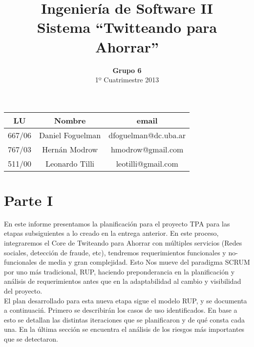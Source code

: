 \documentclass[a4paper,spanish]{article}
\title{Ingeniería de Software II\\ \textbf{Sistema ``Twitteando para Ahorrar''}}
\author{\textbf{Grupo 6}\\ 1º Cuatrimestre 2013}
\date{}
\begin{document}
\maketitle
\vspace{10cm}
\begin{center}

\begin{tabular}{|c|c|c|}
\hline
\hline
\textbf{LU}&\textbf{Nombre}&\textbf{email}\\
\hline
667/06&Daniel Foguelman &dfoguelman@dc.uba.ar\\
\hline
767/03&Hernán Modrow&hmodrow@gmail.com\\
\hline
511/00&Leonardo Tilli&leotilli@gmail.com\\
\hline
\hline
\end{tabular}
\end{center}
\newpage

\section{Parte I}

 En este informe presentamos la planificación para el proyecto TPA para las etapas subsiguientes a lo creado en la entrega anterior. En este proceso, integraremos el Core de Twiteando para Ahorrar con múltiples servicios (Redes sociales, detección de fraude, etc), tendremos requerimientos funcionales y no-funcionales de media y gran complejidad. Esto Nos mueve del paradigma SCRUM por uno más tradicional, RUP, haciendo preponderancia en la planificación y análisis de requerimientos antes que en la adaptabilidad al cambio y visibilidad del proyecto. \\

 El plan desarrollado para esta nueva etapa sigue el modelo RUP, y se documenta a continuaci\'n. Primero se describir\'an los casos de uso identificados. En base a esto se detallan las distintas iteraciones que se planificaron y de qu\'e consta cada una. En la \'ultima secci\'on se encuentra el an\'alisis de los riesgos m\'as importantes que se detectaron.





\end{document}
